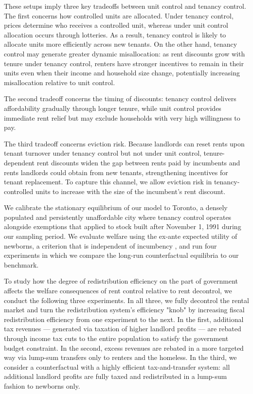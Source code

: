 \documentclass[parskip=full]{article}
\begin{document}
These setups imply three key tradeoffs between unit control and tenancy control. The first concerns how controlled units are allocated. Under tenancy control, prices determine who receives a controlled unit, whereas under unit control allocation occurs through lotteries. As a result, tenancy control is likely to allocate units more efficiently across new tenants. On the other hand, tenancy control may generate greater dynamic misallocation: as rent discounts grow with tenure under tenancy control, renters have stronger incentives to remain in their units even when their income and household size change, potentially increasing misallocation relative to unit control.

The second tradeoff concerns the timing of discounts: tenancy control delivers affordability gradually through longer tenure, while unit control provides immediate rent relief but may exclude households with very high willingness to pay.

The third tradeoff concerns eviction risk. Because landlords can reset rents upon tenant turnover under tenancy control but not under unit control, tenure-dependent rent discounts widen the gap between rents paid by incumbents and rents landlords could obtain from new tenants, strengthening incentives for tenant replacement. To capture this channel, we allow eviction risk in tenancy-controlled units to increase with the size of the incumbent’s rent discount.

We calibrate the stationary equilibrium of our model to Toronto, a densely populated and persistently unaffordable city where tenancy control operates alongside exemptions that applied to stock built after November 1, 1991 during our sampling period. We evaluate welfare using the ex-ante expected utility of newborns, a criterion that is independent of incumbency \citep{ralws-1971,conesa-et-al,gkkoc}, and run four experiments in which we compare the long-run counterfactual equilibria to our benchmark. 

To study how the degree of redistribution efficiency on the part of government affects the welfare consequences of rent control relative to rent decontrol, we conduct the following three experiments. In all three, we fully decontrol the rental market and turn the redistribution system’s efficiency "knob" by increasing fiscal redistribution efficiency from one experiment to the next. In the first, additional tax revenues — generated via taxation of higher landlord profits — are rebated through income tax cuts to the entire population to satisfy the government budget constraint. In the second, excess revenues are rebated in a more targeted way via lump-sum transfers only to renters and the homeless. In the third, we consider a counterfactual with a highly efficient tax-and-transfer system: all additional landlord profits are fully taxed and redistributed in a lump-sum fashion to newborns only. 
\end{document}
